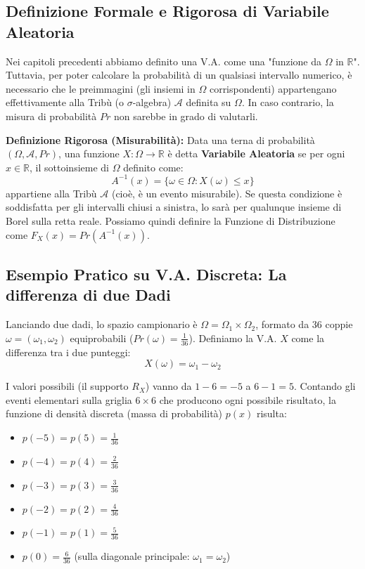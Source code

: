 \documentclass[12pt, a4paper]{article}
\begin{document}
\subsection{Definizione Formale e Rigorosa di Variabile Aleatoria}
Nei capitoli precedenti abbiamo definito una V.A. come una "funzione da $\Omega$ in $\mathbb{R}$". Tuttavia, per poter calcolare la probabilità di un qualsiasi intervallo numerico, è necessario che le preimmagini (gli insiemi in $\Omega$ corrispondenti) appartengano effettivamente alla Tribù (o $\sigma$-algebra) $\mathcal{A}$ definita su $\Omega$. In caso contrario, la misura di probabilità $Pr$ non sarebbe in grado di valutarli.

\textbf{Definizione Rigorosa (Misurabilità):} Data una terna di probabilità $(\Omega, \mathcal{A}, Pr)$, una funzione $X: \Omega \to \mathbb{R}$ è detta \textbf{Variabile Aleatoria} se per ogni $x \in \mathbb{R}$, il sottoinsieme di $\Omega$ definito come:
$$ A^{-1}(x) = \{\omega \in \Omega : X(\omega) \le x\} $$
appartiene alla Tribù $\mathcal{A}$ (cioè, è un evento misurabile). 
Se questa condizione è soddisfatta per gli intervalli chiusi a sinistra, lo sarà per qualunque insieme di Borel sulla retta reale.
Possiamo quindi definire la Funzione di Distribuzione come $F_X(x) = Pr(A^{-1}(x))$.

\subsection{Esempio Pratico su V.A. Discreta: La differenza di due Dadi}
Lanciando due dadi, lo spazio campionario è $\Omega = \Omega_1 \times \Omega_2$, formato da 36 coppie $\omega = (\omega_1, \omega_2)$ equiprobabili ($Pr(\omega) = \frac{1}{36}$).
Definiamo la V.A. $X$ come la differenza tra i due punteggi:
$$ X(\omega) = \omega_1 - \omega_2 $$

I valori possibili (il supporto $R_X$) vanno da $1-6 = -5$ a $6-1 = 5$.
Contando gli eventi elementari sulla griglia $6 \times 6$ che producono ogni possibile risultato, la funzione di densità discreta (massa di probabilità) $p(x)$ risulta:
\begin{itemize}
    \item $p(-5) = p(5) = \frac{1}{36}$
    \item $p(-4) = p(4) = \frac{2}{36}$
    \item $p(-3) = p(3) = \frac{3}{36}$
    \item $p(-2) = p(2) = \frac{4}{36}$
    \item $p(-1) = p(1) = \frac{5}{36}$
    \item $p(0) = \frac{6}{36}$ (sulla diagonale principale: $\omega_1 = \omega_2$)
\end{itemize}
\end{document}

